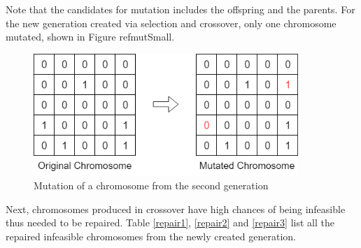     Note that the candidates for mutation includes the offspring and the parents. For the new generation created via selection and crossover, only one chromosome mutated, shown in Figure ref{mutSmall}.
    
    \begin{figure}[h]
        \centering
        \includegraphics[width=100mm]{Figures/mutSmall.png}
        \caption{Mutation of a chromosome from the second generation}
        \label{mutSmall}
    \end{figure}
    
    Next, chromosomes produced in crossover have high chances of being infeasible thus needed to be repaired. Table \ref{repair1}, \ref{repair2} and \ref{repair3} list all the repaired infeasible chromosomes from the newly created generation.
    
